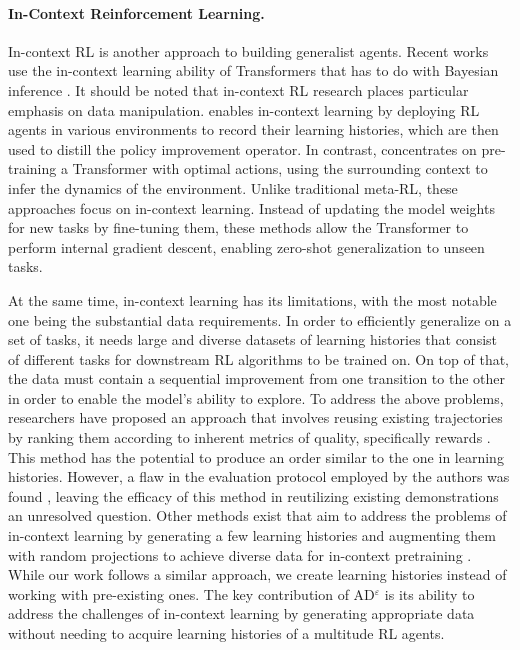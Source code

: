 \documentclass{article}
\theoremstyle{plain}
\theoremstyle{definition}
\theoremstyle{remark}
\begin{document}
\paragraph{In-Context Reinforcement Learning.}
In-context RL is another approach to building generalist agents. Recent works use the in-context learning ability of Transformers \cite{von2023transformers, dai2022can, wei2022emergent} that has to do with Bayesian inference \cite{muller2021transformers, xie2021explanation}. It should be noted that in-context RL research places particular emphasis on data manipulation. \citet{laskin2022context} enables in-context learning by deploying RL agents in various environments to record their learning histories, which are then used to distill the policy improvement operator. In contrast, \citet{lee2023supervised} concentrates on pre-training a Transformer with optimal actions, using the surrounding context to infer the dynamics of the environment. Unlike traditional meta-RL, these approaches focus on in-context learning. Instead of updating the model weights for new tasks by fine-tuning them, these methods allow the Transformer to perform internal gradient descent, enabling zero-shot generalization to unseen tasks.

At the same time, in-context learning has its limitations, with the most notable one being the substantial data requirements. In order to efficiently generalize on a set of tasks, it needs large and diverse datasets of learning histories that consist of different tasks for downstream RL algorithms to be trained on. On top of that, the data must contain a sequential improvement from one transition to the other in order to enable the model's ability to explore. To address the above problems, researchers have proposed an approach that involves reusing existing trajectories by ranking them according to inherent metrics of quality, specifically rewards \cite{liu2023emergent}. This method has the potential to produce an order similar to the one in learning histories. However, a flaw in the evaluation protocol employed by the authors was found \cite{zisman2023agentic}, leaving the efficacy of this method in reutilizing existing demonstrations an unresolved question. Other methods exist that aim to address the problems of in-context learning by generating a few learning histories and augmenting them with random projections to achieve diverse data for in-context pretraining \cite{kirsch2023towards, kirsch2022generalpurpose}. While our work follows a similar approach, we create learning histories instead of working with pre-existing ones. The key contribution of AD$^\varepsilon$ is its ability to address the challenges of in-context learning by generating appropriate data without needing to acquire learning histories of a multitude RL agents.
\end{document}
